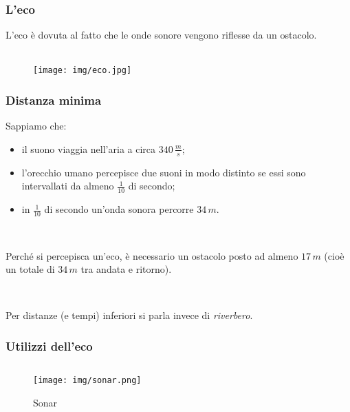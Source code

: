 \documentclass[]{beamer}
\theoremstyle{plain}
\begin{document}
\begin{frame}
\frametitle{L'eco}
L'eco è dovuta al fatto che le onde sonore vengono \alert<1>{riflesse} da un ostacolo.\\~\\
\begin{figure}
\texttt{[image: img/eco.jpg]}
\end{figure}
\end{frame}
\begin{frame}
\frametitle{Distanza minima}
Sappiamo che:
\begin{itemize}
  \item il suono viaggia nell'aria a circa $ 340 \, \frac{m}{s} $;\pause
  \item l'orecchio umano percepisce due suoni in modo distinto se essi sono intervallati da almeno $ \frac{1}{10} $ di secondo;\pause
  \item in $ \frac{1}{10} $ di secondo un'onda sonora percorre $ 34\, m $.\pause
\end{itemize}

~

Perché si percepisca un'eco, \alert{è necessario un ostacolo posto ad almeno $ 17 \, m $} (cioè un totale di $ 34 \, m $ tra andata e ritorno).\pause

~

Per distanze (e tempi) inferiori si parla invece di \emph{riverbero}.
\end{frame}

\begin{frame}
  \frametitle{Utilizzi dell'eco}
  \begin{columns}
    \begin{column}{0.3\textwidth}
      \begin{figure}
        \texttt{[image: img/sonar.png]}
        
        Sonar
        
        ~
      \end{figure}
    \end{column}
    \begin{column}{0.3\textwidth}
    \end{column}
    \begin{column}{0.3\textwidth}
    \end{column}
  \end{columns}
\end{frame}
\end{document}
